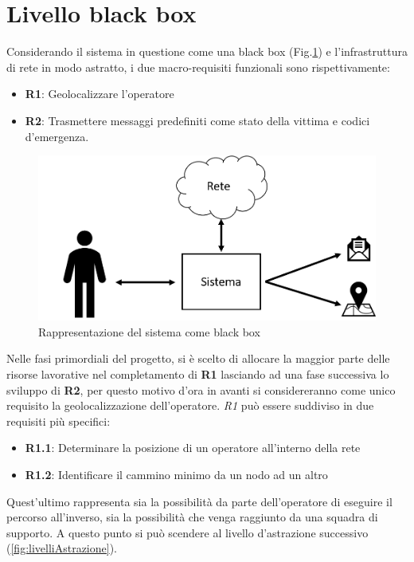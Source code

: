 \section{Livello black box}
Considerando il sistema in questione come una black box (Fig.\ref{fig:requisitiFunzionali}) e l'infrastruttura di rete in modo astratto, i due macro-requisiti funzionali  sono rispettivamente:
\begin{itemize}
	\item \textbf{R1}: Geolocalizzare l'operatore
	\item \textbf{R2}: Trasmettere messaggi predefiniti come stato della vittima e codici d'emergenza.
\end{itemize}
\begin{figure}[H]
	\centering
	\includegraphics[scale=0.3]{DescrizioneDelSistema/requisitiSistema.png}
	\caption{Rappresentazione del sistema come black box }
	\label{fig:requisitiFunzionali}
\end{figure}
Nelle fasi primordiali del progetto, si è scelto di allocare la maggior parte delle risorse lavorative nel completamento di \textbf{R1} lasciando ad una fase successiva lo sviluppo di \textbf{R2}, per questo motivo d'ora in avanti si considereranno come unico requisito la geolocalizzazione dell'operatore. \textit{R1} può essere suddiviso in due requisiti più specifici:
\begin{itemize}
	\item \textbf{R1.1}: Determinare la posizione di un operatore all'interno della rete
	\item \textbf{R1.2}: Identificare il cammino minimo da un nodo ad un altro
\end{itemize}
Quest'ultimo rappresenta sia la possibilità da parte dell'operatore di eseguire il percorso all'inverso, sia la possibilità che venga raggiunto da una squadra di supporto. A questo punto si può scendere al livello d'astrazione successivo (\ref{fig:livelliAstrazione}).
\newpage 


